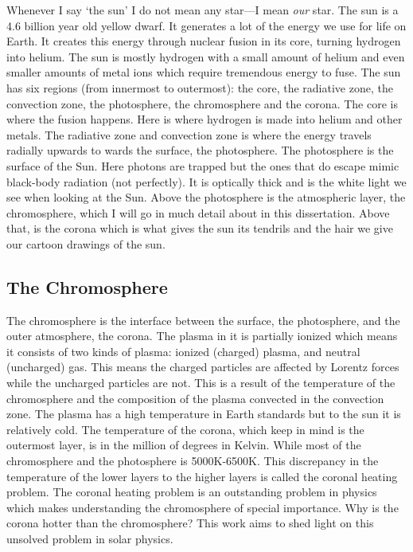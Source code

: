 \documentclass[12pt,upcase]{umlthesis}
\begin{document}
Whenever I say `the sun' I do not mean any star---I mean \textit{our} star. The sun is a 4.6 billion year old yellow dwarf. It generates a lot of the energy we use for life on Earth. It creates this energy through nuclear fusion in its core, turning hydrogen into helium. The sun is mostly hydrogen with a small amount of helium and even smaller amounts of metal ions which require tremendous energy to fuse. The sun has six regions (from innermost to outermost): the core, the radiative zone, the convection zone, the photosphere, the chromosphere and the corona. The core is where the fusion happens. Here is where hydrogen is made into helium and other metals. The radiative zone and convection zone is where the energy travels radially upwards to wards the surface, the photosphere. The photosphere is the surface of the Sun. Here photons are trapped but the ones that do escape mimic black-body radiation (not perfectly). It is optically thick and is the white light we see when looking at the Sun. Above the photosphere is the atmospheric layer, the chromosphere, which I will go in much detail about in this dissertation. Above that, is the corona which is what gives the sun its tendrils and the hair we give our cartoon drawings of the sun.

\subsection{The Chromosphere}

The chromosphere is the interface between the surface, the photosphere, and the outer atmosphere, the corona. The plasma in it is partially ionized which means it consists of two kinds of plasma: ionized (charged) plasma, and neutral (uncharged) gas. This means the charged particles are affected by Lorentz forces while the uncharged particles are not. This is a result of the temperature of the chromosphere and the composition of the plasma convected in the convection zone. The plasma has a high temperature in Earth standards but to the sun it is relatively cold. The temperature of the corona, which keep in mind is the outermost layer, is in the million of degrees in Kelvin. While most of the chromosphere and the photosphere is 5000K-6500K. This discrepancy in the temperature of the lower layers to the higher layers is called the coronal heating problem. The coronal heating problem is an outstanding problem in physics which makes understanding the chromosphere of special importance. Why is the corona hotter than the chromosphere? This work aims to shed light on this unsolved problem in solar physics.
\end{document}
